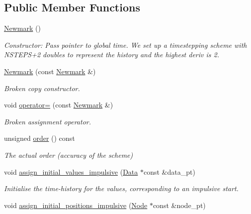 \subsection*{Public Member Functions}
\begin{DoxyCompactItemize}
\item 
\hyperlink{classoomph_1_1Newmark_a0fb7152525d4098b4adc5f7956c8c73f}{Newmark} ()
\begin{DoxyCompactList}\small\item\em Constructor\+: Pass pointer to global time. We set up a timestepping scheme with N\+S\+T\+E\+P\+S+2 doubles to represent the history and the highest deriv is 2. \end{DoxyCompactList}\item 
\hyperlink{classoomph_1_1Newmark_a439fe6ce251eea0cf7e0a5e8b3a0406e}{Newmark} (const \hyperlink{classoomph_1_1Newmark}{Newmark} \&)
\begin{DoxyCompactList}\small\item\em Broken copy constructor. \end{DoxyCompactList}\item 
void \hyperlink{classoomph_1_1Newmark_a549944d9eecd9fe43cd7c81fad571986}{operator=} (const \hyperlink{classoomph_1_1Newmark}{Newmark} \&)
\begin{DoxyCompactList}\small\item\em Broken assignment operator. \end{DoxyCompactList}\item 
unsigned \hyperlink{classoomph_1_1Newmark_a98d62ea693c8d7a90b6b8273c92c3c75}{order} () const
\begin{DoxyCompactList}\small\item\em The actual order (accuracy of the scheme) \end{DoxyCompactList}\item 
void \hyperlink{classoomph_1_1Newmark_a97195b87c11688ae6c17f1a5d2f821e1}{assign\+\_\+initial\+\_\+values\+\_\+impulsive} (\hyperlink{classoomph_1_1Data}{Data} $\ast$const \&data\+\_\+pt)
\begin{DoxyCompactList}\small\item\em Initialise the time-\/history for the values, corresponding to an impulsive start. \end{DoxyCompactList}\item 
void \hyperlink{classoomph_1_1Newmark_a8b058a0cc65b0f24a119d5d9120952a2}{assign\+\_\+initial\+\_\+positions\+\_\+impulsive} (\hyperlink{classoomph_1_1Node}{Node} $\ast$const \&node\+\_\+pt)

\end{DoxyCompactItemize}
